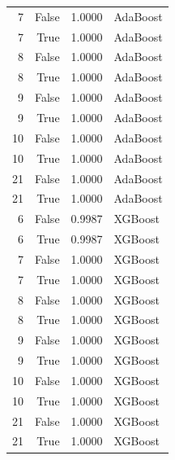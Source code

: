 \begin{longtable}{rrrl}
7 & False & 1.0000 & AdaBoost \\
7 & True & 1.0000 & AdaBoost \\
8 & False & 1.0000 & AdaBoost \\
8 & True & 1.0000 & AdaBoost \\
9 & False & 1.0000 & AdaBoost \\
9 & True & 1.0000 & AdaBoost \\
10 & False & 1.0000 & AdaBoost \\
10 & True & 1.0000 & AdaBoost \\
21 & False & 1.0000 & AdaBoost \\
21 & True & 1.0000 & AdaBoost \\
6 & False & 0.9987 & XGBoost \\
6 & True & 0.9987 & XGBoost \\
7 & False & 1.0000 & XGBoost \\
7 & True & 1.0000 & XGBoost \\
8 & False & 1.0000 & XGBoost \\
8 & True & 1.0000 & XGBoost \\
9 & False & 1.0000 & XGBoost \\
9 & True & 1.0000 & XGBoost \\
10 & False & 1.0000 & XGBoost \\
10 & True & 1.0000 & XGBoost \\
21 & False & 1.0000 & XGBoost \\
21 & True & 1.0000 & XGBoost \\
\end{longtable}
